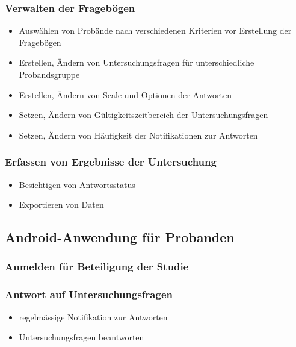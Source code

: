 \documentclass[a4paper]{scrreprt}
\begin{document}
                \subsubsection{Verwalten der Frageb\"ogen}
                    \begin{itemize}
                        \item Ausw\"ahlen von Prob\"ande nach verschiedenen Kriterien vor Erstellung der Frageb\"ogen
                        \item Erstellen, \"Andern von Untersuchungsfragen f\"ur unterschiedliche Probandsgruppe
                        \item Erstellen, \"Andern von Scale und Optionen der Antworten
                        \item Setzen, \"Andern von G\"ultigkeitszeitbereich der Untersuchungsfragen
                        \item Setzen, \"Andern von H\"aufigkeit der Notifikationen zur Antworten
                    \end{itemize}

                \subsubsection{Erfassen von Ergebnisse der Untersuchung}
                    \begin{itemize}
                        \item Besichtigen von Antwortsstatus
                        \item Exportieren von Daten
                    \end{itemize}
            \vspace*{2cm}

            \subsection{Android-Anwendung f\"ur Probanden}
                \vspace*{0.2cm}

                \subsubsection{Anmelden f\"ur Beteiligung der Studie}

                \subsubsection{Antwort auf Untersuchungsfragen}
                    \begin{itemize}
                        \item regelm\"assige Notifikation zur Antworten
                        \item Untersuchungsfragen beantworten
                    \end{itemize}
\end{document}
